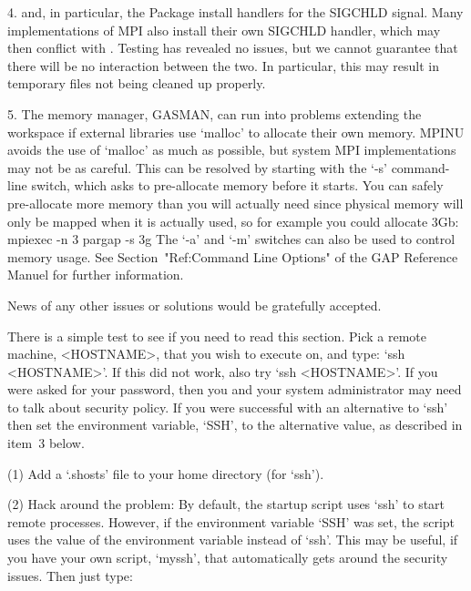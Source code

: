 \item{4.}
  {\GAP} and, in particular, the  Package install handlers for the 
  SIGCHLD signal. Many implementations of MPI also install their own SIGCHLD 
  handler, which may then conflict with {\ParGAP}. Testing has revealed no 
  issues, but we cannot guarantee that there will be no interaction between the 
  two. In particular, this may result in temporary files not being cleaned up 
  properly.

\item{5.}
  The {\GAP} memory manager, GASMAN, can run into problems extending the 
  {\GAP} workspace if external libraries use `malloc' to allocate their own
  memory. MPINU avoids the use of `malloc' as much as possible, but
  system MPI implementations may not be as careful. This can be resolved by
  starting {\ParGAP} with the `-s' command-line switch, which asks
  {\ParGAP} to pre-allocate memory before it starts. You can safely 
  pre-allocate more memory than you will actually need since physical memory
  will only be mapped when it is actually used, so for example you could 
  allocate 3Gb:
\begintt
mpiexec -n 3 pargap -s 3g
\endtt
  The `-a' and `-m' switches can also be used to control memory usage. See 
  Section~"Ref:Command Line Options" of the GAP Reference Manuel for 
  further information.
\endlist

News of any other issues or solutions would be gratefully accepted.




There is a simple test to see if you need to read this  section.  Pick  a
remote machine, <HOSTNAME>, that you wish to execute on, and  type:  `ssh
<HOSTNAME>'. If this did not work, also try `ssh <HOSTNAME>'. If you were
asked for your password, then you and your system administrator may  need
to talk about security policy. If you were successful with an alternative
to `ssh' then  set  the environment  variable, `SSH', to  the alternative
value, as described in item~3 below.

\beginlist
\item{(1)}
    Add a `.shosts' file to your home directory (for `ssh').

\item{(2)}
    Hack around the problem: By default, the startup script uses `ssh' to
    start remote processes. However, if the  environment  variable  `SSH'
    was set, the script  uses  the  value  of  the  environment  variable
    instead of `ssh'. This may be useful, if you have  your  own  script,
    `myssh', that automatically gets around  the  security  issues.  Then
    just type:

